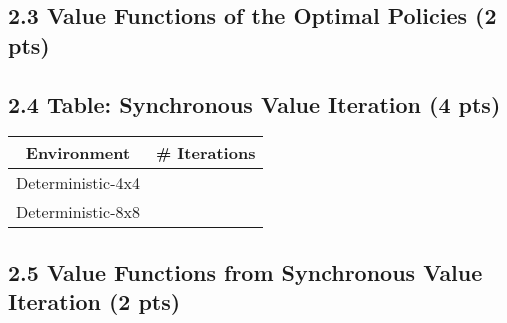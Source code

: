 \documentclass[12pt]{article}
\begin{document}
\subsection*{2.3 Value Functions of the Optimal Policies (2 pts)}
\begin{solution}[height=6.8cm]
\end{solution}

\subsection*{2.4 Table: Synchronous Value Iteration (4 pts)}
\begin{center}
  \begin{tabular}{|c|c|}\hline
    {\bf Environment} & {\bf \# Iterations} \\ \hline
    Deterministic-4x4 & \\ \hline
    Deterministic-8x8 & \\ \hline
  \end{tabular}
\end{center}

\subsection*{2.5 Value Functions from Synchronous Value Iteration (2 pts)}
\begin{solution}[height=6.8cm]
\end{solution}
\end{document}
